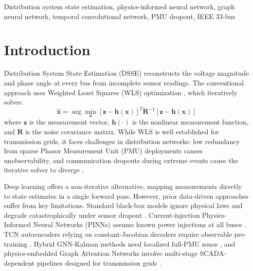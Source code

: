 \documentclass[conference]{IEEEtran}
\begin{document}
\begin{IEEEkeywords}
Distribution system state estimation, physics-informed neural network, graph neural network, temporal convolutional network, PMU dropout, IEEE 33-bus
\end{IEEEkeywords}

\section{Introduction}

Distribution System State Estimation (DSSE) reconstructs the voltage magnitude and phase angle at every bus from incomplete sensor readings. The conventional approach uses Weighted Least Squares (WLS) optimization \cite{schweppe1970}, which iteratively solves:
\begin{equation}
    \hat{\mathbf{x}} = \arg\min_{\mathbf{x}} \left[\mathbf{z} - \mathbf{h}(\mathbf{x})\right]^T \mathbf{R}^{-1} \left[\mathbf{z} - \mathbf{h}(\mathbf{x})\right]
    \label{eq:wls}
\end{equation}
where $\mathbf{z}$ is the measurement vector, $\mathbf{h}(\cdot)$ is the nonlinear measurement function, and $\mathbf{R}$ is the noise covariance matrix. While WLS is well established for transmission grids, it faces challenges in distribution networks: low redundancy from sparse Phasor Measurement Unit (PMU) deployments causes unobservability, and communication dropouts during extreme events cause the iterative solver to diverge \cite{primadianto2017}.

Deep learning offers a non-iterative alternative, mapping measurements directly to state estimates in a single forward pass. However, prior data-driven approaches suffer from key limitations. Standard black-box models ignore physical laws and degrade catastrophically under sensor dropout \cite{mestav2019}. Current-injection Physics-Informed Neural Networks (PINNs) assume known power injections at all buses \cite{iliadis2025}. TCN autoencoders relying on constant-Jacobian decoders require observable pre-training \cite{raghuvamsi2024}. Hybrid GNN-Kalman methods need localized full-PMU zones \cite{ngo2024}, and physics-embedded Graph Attention Networks involve multi-stage SCADA-dependent pipelines designed for transmission grids \cite{hu2025}.
\end{document}
